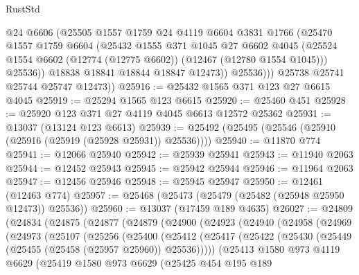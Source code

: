 \begin{lexlean}{RustStd}
\begin{coremodule}
                @24
                @6606
                (@25505
                  @1557
                  @1759
                  @24
                  @4119
                  @6604
                  @3831
                  @1766
                  (@25470
                    @1557
                    @1759
                    @6604
                    (@25432
                      @1555
                      @371
                      @1045
                      @27
                      @6602
                      @4045
                      (@25524 @1554 @6602 (@12774 (@12775 @6602)) (@12467 (@12780 @1554 @1045)))
                      @25536))
                  @18838
                  @18841
                  @18844
                  @18847
                  @12473))
              @25536)))
        @25738
        @25741
        @25744
        @25747
        @12473))
@25916 := @25432 @1565 @371 @123 @27 @6615 @4045
@25919 := @25294 @1565 @123 @6615
@25920 := @25460 @451
@25928 := @25920 @123 @371 @27 @4119 @4045 @6613 @12572 @25362
@25931 := @13037 (@13124 @123 @6613)
@25939 := @25492 (@25495 (@25546 (@25910 (@25916 (@25919 (@25928 @25931)) @25536))))
@25940 := @11870 @774
@25941 := @12066 @25940
@25942 := @25939 @25941
@25943 := @11940 @2063
@25944 := @12452 @25943
@25945 := @25942 @25944
@25946 := @11964 @2063
@25947 := @12456 @25946
@25948 := @25945 @25947
@25950 := @12461 (@12463 @774)
@25957 := @25468 (@25473 (@25479 (@25482 (@25948 @25950 @12473)) @25536))
@25960 := @13037 (@17459 @189 @4635)
@26027 := @24809
    (@24834
      (@24875
        (@24877
          (@24879
            (@24900
              (@24923
                (@24940
                  (@24958
                    (@24969
                      (@24973
                        (@25107
                          (@25256
                            (@25400
                              (@25412
                                (@25417
                                  (@25422
                                    (@25430 (@25449 (@25455 (@25458 (@25957 @25960)) @25536)))))
                                (@25413
                                  @1580
                                  @973
                                  @4119
                                  @6629
                                  (@25419
                                    @1580
                                    @973
                                    @6629
                                    (@25425
                                      @454
                                      @195
                                      @189

\end{coremodule}
\end{lexlean}
